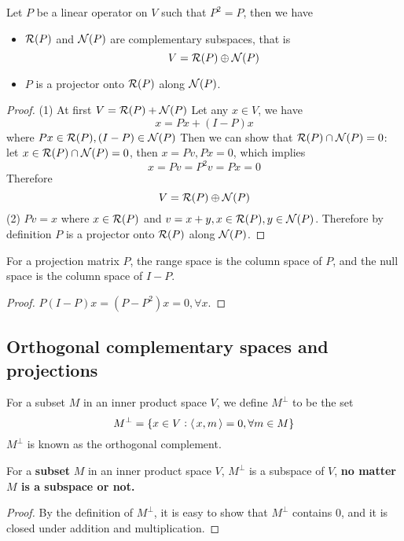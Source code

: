 \begin{refsection}
\begin{theorem}\cite[387]{meyer2000matrix}
	Let $P$ be a linear operator on $V$ such that $P^2 = P$, then we have
	\begin{itemize}
		\item $\mathcal{R}(P)$ and $\mathcal{N}(P)$ are complementary subspaces, that is
		$$V = \mathcal{R}(P) \oplus \mathcal{N}(P)$$
		\item $P$ is a projector onto $\mathcal{R}(P)$ along $\mathcal{N}(P)$.
	\end{itemize}
\end{theorem}
\begin{proof}
	(1) At first $V = \mathcal{R}(P) +  \mathcal{N}(P)$
	Let any $x\in V$, we have
	$$x = Px  + (I-P)x$$
	where $Px \in \mathcal{R}(P), (I-P)\in \mathcal{N}(P)$
	Then we can show that $\mathcal{R}(P)\cap \mathcal{N}(P) = 0$: let $x\in \mathcal{R}(P)\cap \mathcal{N}(P) = 0$, then $x = Pv, Px = 0$, which implies
	$$x = Pv = P^2 v = Px = 0$$
	Therefore 
	$$V = \mathcal{R}(P) \oplus \mathcal{N}(P)$$
	(2) $Pv = x$ where $x\in \mathcal{R}(P)$ and $v=x+y,x\in \mathcal{R}(P),y\in \mathcal{N}(P)$. Therefore by definition $P$ is a projector onto $\mathcal{R}(P)$ along $\mathcal{N}(P)$.
\end{proof}


\begin{corollary}
	For a projection matrix $P$, the range space is the column space of $P$, and the null space is the column space of $I-P$.
\end{corollary}
\begin{proof}
$P(I-P)x = (P-P^2)x = 0,\forall x$.	
\end{proof}


\subsection{Orthogonal complementary spaces and projections}\label{ch:linearalgebra:sec:OrthogonalComplementarySubspacesProjections}
\begin{definition}\cite[404]{meyer2000matrix}
For a subset $M$ in an inner product space $V$, we define $M^\perp$ to be the set 
$$M^\perp = \{x\in V: {\left< \, x,m \, \right>}=0,\forall m\in M\}$$	
$M^\perp$ is known as the orthogonal complement.
\end{definition}

\begin{lemma}\cite[404]{meyer2000matrix}
For a \textbf{subset} $M$ in an inner product space $V$, $M^\perp$ is a subspace of $V$, \textbf{no matter $M$ is a subspace or not.}
\end{lemma}
\begin{proof}
	By the definition of $M^\perp$, it is easy to show that $M^\perp$ contains 0, and it is closed under addition and multiplication.
\end{proof}


\end{refsection}
